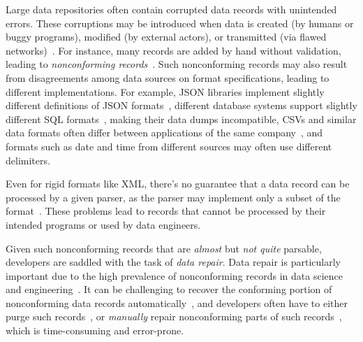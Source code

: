 \documentclass[sigconf,review,anonymous]{acmart}
\newcommand{\dtask}{data repair\xspace}
\newcommand{\Dtask}{Data repair\xspace}
\begin{document}
Large data repositories often contain corrupted data records with unintended errors.
These corruptions may be introduced when data is created (by humans or buggy programs), modified
(by external actors), or transmitted (via flawed networks)~\cite{scaffidi2008accommodating}.
For instance, many records are added by hand without validation, leading to
\textit{nonconforming records}~\cite{mucslu2015preventing}. Such nonconforming
records may also result from disagreements among data sources on format
specifications, leading to different implementations. For example, JSON
libraries implement slightly different definitions of JSON formats~\cite{harrand2021behavioral,seriot2016parsing},
different database systems support slightly different SQL formats~\cite{arvin2018comparison},
making their data dumps incompatible,
CSVs and similar data formats often differ between applications of the same
company~\cite{taocp}, and formats such as date and time from different sources
may often use different delimiters.

Even for rigid formats like XML, there's no guarantee
that a data record can be processed by a given parser, as the parser may
implement only a subset of the format~\cite{xmlconformance}.
These problems lead to records that cannot be processed by their intended
programs or used by data engineers.

Given such nonconforming records that are \emph{almost} but \emph{not quite}
parsable, developers are saddled with the task of \textit{\dtask}.
\Dtask is particularly important due to the high prevalence of nonconforming
records in data science and engineering~\cite{ridzuan2019review,kirschner2020debugging}.
It can be challenging to recover the conforming portion of nonconforming
data records automatically~\cite{scaffidi2008topes,ridzuan2019review},
and developers often have to either purge such records~\cite{hernandez1998real},
or \emph{manually} repair nonconforming parts of such records~\cite{kirschner2020debugging},
which is time-consuming and error-prone.
\end{document}
